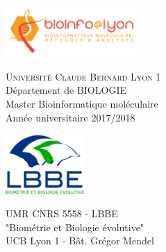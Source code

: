 
\begin{titlepage}


\begin{center}

\begin{minipage}[t]{0.48\textwidth}
  \begin{flushleft}
    \includegraphics [width=50mm]{images/Logo_bioinfo.png} \\[0.5cm]
    \begin{spacing}{1.5}
      \textsc{Université Claude Bernard Lyon 1} \\
		Département de BIOLOGIE \\ 
		Master Bioinformatique moléculaire \\
		Année universitaire 2017/2018
    \end{spacing}
  \end{flushleft}
\end{minipage}
\begin{minipage}[t]{0.48\textwidth}
  \begin{flushright}
    \includegraphics [width=30mm]{images/Logo_lbbe.png} \\[0.5cm]
    \begin{spacing}{1.5}
    \textsc{UMR CNRS 5558 - LBBE} \\
	"Biométrie et Biologie évolutive"\\
	UCB Lyon 1  - Bât. Grégor Mendel\\
	
	\end{spacing}
  \end{flushright}
\end{minipage} \\[3.5cm]



\large \textbf \reportsubject\\[0.5cm]
\HRule \\[0.5cm]

{\Large \textbf \reporttitle }\\[0.3cm]


\end{center}
\end{titlepage}
